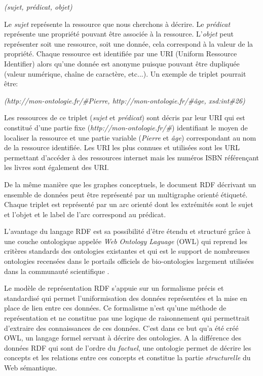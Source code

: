 \textit{(sujet, prédicat, objet)}

Le \textit{sujet} représente la ressource que nous cherchons à décrire. Le \textit{prédicat} représente une propriété pouvant être associée à la ressource. L'\textit{objet} peut représenter soit une ressource, soit une donnée, cela correspond à la valeur de la propriété.
Chaque ressource est identifiée par une URI (Uniform Ressource Identifier) alors qu'une donnée est anonyme puisque pouvant être dupliquée (valeur numérique, chaîne de caractère, etc...). Un exemple de triplet pourrait être:

\textit{(http://mon-ontologie.fr/\#Pierre, http://mon-ontologie.fr/\#âge, xsd:int\#26)}

Les ressources de ce triplet (\textit{sujet} et \textit{prédicat}) sont décris par leur URI qui est constitué d'une partie fixe (\textit{http://mon-ontologie.fr/\#}) identifiant le moyen de localiser la ressource et une partie variable (\textit{Pierre} et \textit{âge}) correspondant au nom de la ressource identifiée. Les URI les plus connues et utilisées sont les URL permettant d'accéder à des ressources internet mais les numéros ISBN référençant les livres sont également des URI.

De la même manière que les graphes conceptuels, le document RDF décrivant un ensemble de données peut être représenté par un multigraphe orienté étiqueté. Chaque triplet est représenté par un arc orienté dont les extrémités sont le sujet et l'objet et le label de l'arc correspond au prédicat.

L'avantage du langage RDF est sa possibilité d'être étendu et structuré grâce à une couche ontologique appelée \textit{Web Ontology Laguage} (OWL) qui reprend les critères standards des ontologies existantes et qui est le support de nombreuses ontologies recensées dans le portails officiels de bio-ontologies largement utilisées dans la communauté scientifique \cite{smith_obo_2007}.

Le modèle de représentation RDF s'appuie sur un formalisme précis et standardisé qui permet l'uniformisation des données représentées et la mise en place de lien entre ces données. Ce formalisme n'est qu'une méthode de représentation et ne constitue pas une logique de raisonnement qui permettrait d'extraire des connaissances de ces données. C'est dans ce but qu'a été créé OWL, un langage formel servant à décrire des ontologies. A la différence des données RDF qui sont de l'ordre du \textit{factuel}, une ontologie permet de décrire les concepts et les relations entre ces concepts et constitue la partie \textit{structurelle} du Web sémantique.

